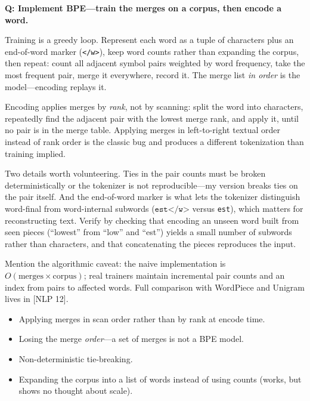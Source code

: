 \begin{interviewq}
\textbf{Q: Implement BPE---train the merges on a corpus, then encode a word.}

 \quad {} \quad \badgefreq{\freqhigh}

\stronganswer

Training is a greedy loop. Represent each word as a tuple of characters plus an end-of-word marker (\texttt{</w>}), keep word counts rather than expanding the corpus, then repeat: count all adjacent symbol pairs weighted by word frequency, take the most frequent pair, merge it everywhere, record it. The merge list \emph{in order} is the model---encoding replays it.

Encoding applies merges by \emph{rank}, not by scanning: split the word into characters, repeatedly find the adjacent pair with the lowest merge rank, and apply it, until no pair is in the merge table. Applying merges in left-to-right textual order instead of rank order is the classic bug and produces a different tokenization than training implied.

Two details worth volunteering. Ties in the pair counts must be broken deterministically or the tokenizer is not reproducible---my version breaks ties on the pair itself. And the end-of-word marker is what lets the tokenizer distinguish word-final from word-internal subwords ($\texttt{est</w>}$ versus \texttt{est}), which matters for reconstructing text. Verify by checking that encoding an unseen word built from seen pieces (``lowest'' from ``low'' and ``est'') yields a small number of subwords rather than characters, and that concatenating the pieces reproduces the input.

Mention the algorithmic caveat: the naive implementation is $O(\text{merges} \times \text{corpus})$; real trainers maintain incremental pair counts and an index from pairs to affected words. Full comparison with WordPiece and Unigram lives in [NLP 12].

\redflags
\begin{itemize}
    \item Applying merges in scan order rather than by rank at encode time.
    \item Losing the merge \emph{order}---a set of merges is not a BPE model.
    \item Non-deterministic tie-breaking.
    \item Expanding the corpus into a list of words instead of using counts (works, but shows no thought about scale).
\end{itemize}


\end{interviewq}
